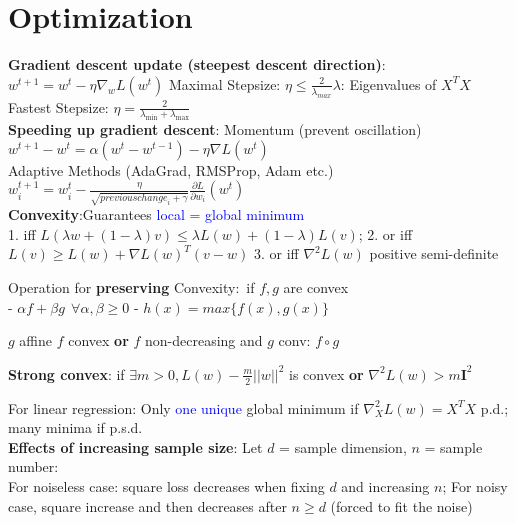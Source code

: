 
\section{Optimization}
\textbf{Gradient descent update (steepest descent direction)}:
$w^{t+1} = w^t - \eta\nabla_w L(w^t)$
Maximal Stepsize: $\eta \leq \frac{2}{\lambda_{max}}$\quad  $\lambda$: Eigenvalues of $X^TX$ \\
Fastest Stepsize: $\eta = \frac{2}{\lambda_\mathrm{min}+\lambda_\mathrm{max}}$\\
\textbf{Speeding up gradient descent}: 
Momentum (prevent oscillation) $w^{t+1} - w^{t} = \alpha(w^t - w^{t-1}) - \eta\nabla L(w^t)$ \\
Adaptive Methods (AdaGrad, RMSProp, Adam etc.) $w^{t+1}_i = w^t_i - \frac{\eta}{\sqrt{{previouschange}_i + \gamma}}\frac{\partial L}{\partial w_i}(w^t)$ \\
\textbf{Convexity}:Guarantees \textcolor{blue}{local = global minimum}\\

1. iff $L(\lambda w + (1-\lambda)v) \leq \lambda L(w) + (1-\lambda)L(v)$;
2. or iff $L(v) \geq L(w) + \nabla L(w)^T(v-w)$ 
3. or iff $\nabla^2L(w)$ positive semi-definite

Operation for \textbf{preserving} Convexity:\  if $f, g$ are convex \\
- $\alpha f + \beta g \ \ \forall \alpha, \beta \geq 0$ \qquad
- $h(x) = max\{f(x), g(x)\}$

$g$ affine $f$ convex \textbf{or} $f$ non-decreasing and $g$  conv:
$f \circ g$ 


\textbf{Strong convex}:
if $\exists m>0, L(w) - \frac{m}{2} ||w||^2$ is convex \textbf{or} $\nabla^2 L(w) > m\mathbf{I}^2$

For linear regression: Only \textcolor{blue}{one unique} global minimum if $\nabla^2_XL(w)=X^TX$ p.d.; many minima if p.s.d.\\
\textbf{Effects of increasing sample size}:
Let $d$ = sample dimension, $n$ = sample number: \\
For noiseless case: square loss decreases when fixing $d$ and increasing $n$; For noisy case, square increase and then decreases after $n \geq d$ (forced to fit the noise)